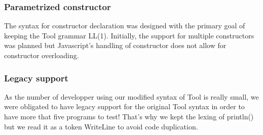 \subsubsection{Parametrized constructor}
The syntax for constructor declaration was designed with the primary
goal of keeping the Tool grammar LL(1). Initially, the support for
multiple constructors was planned but Javascript's handling of
constructor does not allow for constructor overloading.

\subsubsection{Legacy support}
As the number of developper using our modified syntax of Tool is really small, we were obligated to have legacy support for the original Tool syntax in order to have more that five programs to test!
That's why we kept the lexing of println() but we read it as a token WriteLine to avoid code duplication.
